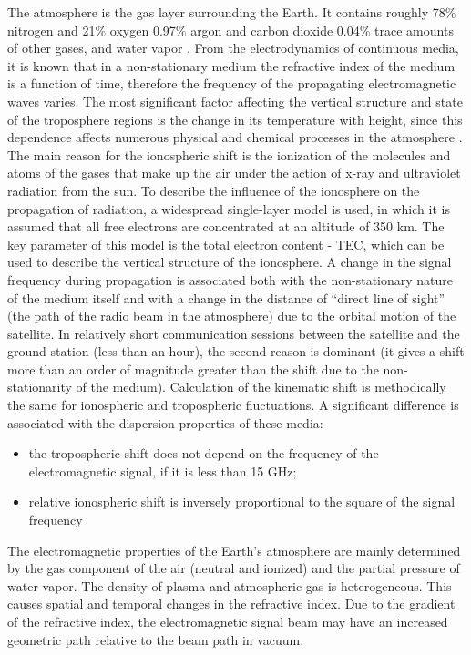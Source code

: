 \documentclass[a4paper,english,bopenany]{article}
\begin{document}
The atmosphere is the gas layer surrounding the Earth. It contains roughly 78$\%$ nitrogen and 21$ \% $ oxygen 0.97$\%$ argon and carbon dioxide 0.04$\%$ trace amounts of other gases, and water vapor \cite{litlink1}. From the electrodynamics of continuous media, it is known that in a non-stationary medium the refractive index of the medium is a function of time, therefore the frequency of the propagating electromagnetic waves varies. The most significant factor affecting the vertical structure and state of the troposphere regions is the change in its temperature with height, since this dependence affects numerous physical and chemical processes in the atmosphere \cite{kushi}. The main reason for the ionospheric shift is the ionization of the molecules and atoms of the gases that make up the air under the action of x-ray and ultraviolet radiation from the sun. To describe the influence of the ionosphere on the propagation of radiation, a widespread single-layer model is used, in which it is assumed that all free electrons are concentrated at an altitude of 350 km. The key parameter of this model is the total electron content - TEC, which can be used to describe the vertical structure of the ionosphere. A change in the signal frequency during propagation is associated both with the non-stationary nature of the medium itself and with a change in the distance of “direct line of sight” (the path of the radio beam in the atmosphere) due to the orbital motion of the satellite. In relatively short communication sessions between the satellite and the ground station (less than an hour), the second reason is dominant (it gives a shift more than an order of magnitude greater than the shift due to the non-stationarity of the medium). Calculation of the kinematic shift is methodically the same for ionospheric and tropospheric fluctuations. A significant difference is associated with the dispersion properties of these media:

\begin{itemize}
	\item the tropospheric shift does not depend on the frequency of the electromagnetic signal, if it is less than 15 GHz;
	\item relative ionospheric shift is inversely proportional to the square of the signal frequency 
\end{itemize}

The electromagnetic properties of the Earth’s atmosphere are mainly determined by the gas component of the air (neutral and ionized) and the partial pressure of water vapor. The density of plasma and atmospheric gas is heterogeneous. This causes spatial and temporal changes in the refractive index. Due to the gradient of the refractive index, the electromagnetic signal beam may have an increased geometric path relative to the beam path in vacuum.
\end{document}
